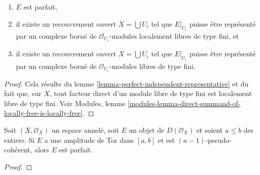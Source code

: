 {\begin{lemma}
\begin{enumerate}

\item  $E$ est parfait,
\item il existe un recouvrement ouvert $X = \bigcup U_i$ tel que
$E|_{U_i}$ puisse être représenté par un complexe borné de $\mathcal{O}_{U_i}$-modules localement libres de type fini, et
\item il existe un recouvrement ouvert $X = \bigcup U_i$ tel que
$E|_{U_i}$ puisse être représenté par un complexe borné de $\mathcal{O}_{U_i}$-modules libres de type fini.

\end{enumerate}

\end{lemma}

\begin{proof}
Cela résulte du lemme \ref{lemma-perfect-independent-representative} et du fait que, sur $X$, tout facteur direct d'un module libre de type fini est localement libre de type fini. Voir Modules, lemme \ref{modules-lemma-direct-summand-of-locally-free-is-locally-free}.
\end{proof}

\begin{lemma}

\label{lemma-perfect-precise}
Soit $(X, \mathcal{O}_X)$ un espace annelé, soit $E$ un objet de $D(\mathcal{O}_X)$ et soient $a \leq b$ des entiers. Si $E$ a une amplitude de Tor dans $[a, b]$ et est $(a - 1)$-pseudo-cohérent, alors $E$ est parfait.
\end{lemma}

\begin{proof}


\end{proof}}
